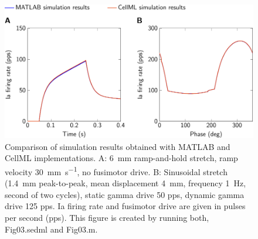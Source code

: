 \documentclass[fleqn,10pt]{physiome}
\begin{document}
\begin{figure}
    \includegraphics[width=\textwidth]{Figure3.pdf}
    \caption{Comparison of simulation results obtained with MATLAB and CellML implementations. A: \SI{6}{\milli\meter} ramp-and-hold stretch, ramp velocity \SI{30}{\milli\meter\per\second}, no fusimotor drive. B:  Sinusoidal stretch (\SI{1.4}{\milli\meter} peak-to-peak, mean displacement \SI{4}{\milli\meter}, frequency \SI{1}{\Hz}, second of two cycles), static gamma drive 50 pps, dynamic gamma drive 125 pps. Ia firing rate and fusimotor drive are given in pulses per second (pps). This figure is created by running both, Fig03.sedml and Fig03.m.}
    \label{fig:fig3}
\end{figure}
\end{document}
